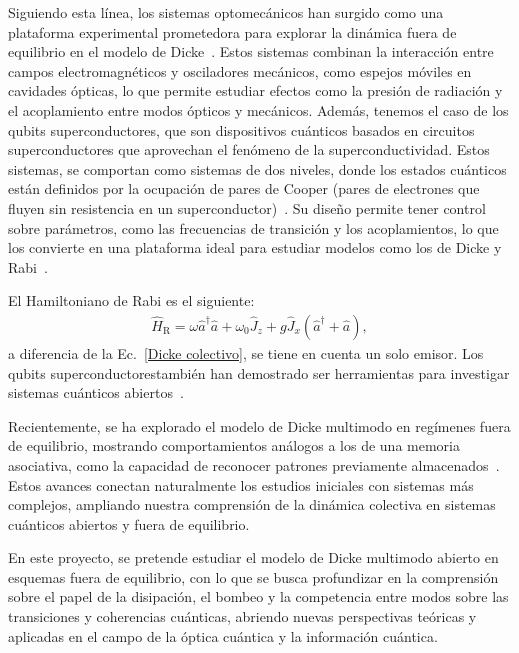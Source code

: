 \documentclass[onecolumn,notitlepage,letterpaper,aps,pra,12pt]{article}
\numberwithin{equation}{section}
\begin{document}
Siguiendo esta línea, los sistemas optomecánicos han surgido como una plataforma experimental prometedora para explorar la dinámica fuera de equilibrio en el modelo de Dicke~\cite{debnath2015}. Estos sistemas combinan la interacción entre campos electromagnéticos y osciladores mecánicos, como espejos móviles en cavidades ópticas, lo que permite estudiar efectos como la presión de radiación y el acoplamiento entre modos ópticos y mecánicos. Además, tenemos el caso de los qubits superconductores, que son dispositivos cuánticos basados en circuitos superconductores que aprovechan el fenómeno de la superconductividad. Estos sistemas, se comportan como sistemas de dos niveles, donde los estados cuánticos están definidos por la ocupación de pares de Cooper (pares de electrones que fluyen sin resistencia en un superconductor)~\cite{Lamata2017}. Su diseño permite tener control sobre parámetros, como las frecuencias de transición y los acoplamientos, lo que los convierte en una plataforma ideal para estudiar modelos como los de Dicke y Rabi~\cite{Mezzacapo14}. 

El Hamiltoniano de Rabi es el siguiente:
\begin{gather}
    \hat{H}_{\text{R}} = \omega\hat{a}^{\dagger}\hat{a} + \omega_{0}\hat{J}_{z} + g\hat{J}_{x}\left(\hat{a}^{\dagger} + \hat{a}\right),
\end{gather}
a diferencia de la Ec.~\ref{Dicke colectivo}, se tiene en cuenta un solo emisor. Los qubits superconductorestambién han demostrado ser herramientas para investigar sistemas cuánticos abiertos~\cite{hwang2018,Lo2021}.

Recientemente, se ha explorado el modelo de Dicke multimodo en regímenes fuera de equilibrio, mostrando comportamientos análogos a los de una memoria asociativa, como la capacidad de reconocer patrones previamente almacenados~\cite{fiorelli2020}. Estos avances conectan naturalmente los estudios iniciales con sistemas más complejos, ampliando nuestra comprensión de la dinámica colectiva en sistemas cuánticos abiertos y fuera de equilibrio.


En este proyecto, se pretende estudiar el modelo de Dicke multimodo abierto en esquemas fuera de equilibrio, con lo que se busca profundizar en la comprensión sobre el papel de la disipación, el bombeo y la competencia entre modos sobre las transiciones y coherencias cuánticas, abriendo nuevas perspectivas teóricas y aplicadas en el campo de la óptica cuántica y la información cuántica. 
\end{document}
